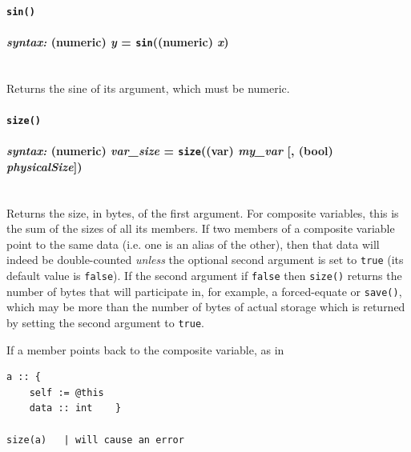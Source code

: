 \documentclass{article}
\newenvironment{code}{
       \begin{list}{}{
               \setlength{\leftmargin}{.4in}
               \setlength{\rightmargin}{0in}
               \setlength{\topsep}{.2in}
       }
       \small
       \item[] }
       { \end{list}   }
\begin{document}





\paragraph{\texttt{sin()}\\\\
\normalfont \emph{syntax: } (numeric) \emph{y} = \texttt{sin}((numeric) \emph{x})\\\\}

Returns the sine of its argument, which must be numeric.\\







\paragraph{\texttt{size()}\\\\
\normalfont \emph{syntax: } (numeric) \emph{var\_size} = \texttt{size}((var) \emph{my\_var} [, (bool) \emph{physicalSize}])\\\\}

Returns the size, in bytes, of the first argument.  For composite variables, this is the sum of the sizes of all its members.  If two members of a composite variable point to the same data (i.e. one is an alias of the other), then that data will indeed be double-counted \emph{unless} the optional second argument is set to \verb#true# (its default value is \verb#false#).  If the second argument if \verb#false# then \verb#size()# returns the number of bytes that will participate in, for example, a forced-equate or \verb#save()#, which may be more than the number of bytes of actual storage which is returned by setting the second argument to \verb#true#.

If a member points back to the composite variable, as in

\begin{code} \begin{verbatim}
a :: {
    self := @this
    data :: int    }

size(a)   | will cause an error
\end{verbatim} \end{code}
\end{document}
